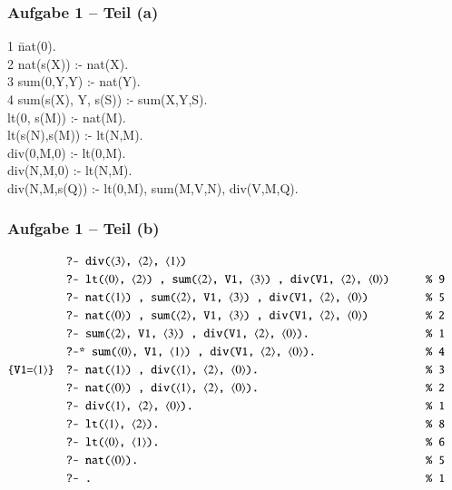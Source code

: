 \documentclass[aspectratio=1610,onlymath, ngerman]{beamer}
\newcommand{\num}[1]{\ensuremath{\langle #1 \rangle}}
\begin{document}
    \maketitle
    
	\begin{frame} \frametitle{Aufgabe 1 -- Teil (a)}
	\small
		\begin{ttfamily}
			\begin{tabbing}
				1 \quad \= nat(0). \\
				2 \> nat(s(X)) :- nat(X). \\[9pt]
				3 \> sum(0,Y,Y) :- nat(Y). \\
				4 \> sum(s(X), Y, s(S)) :- sum(X,Y,S). \\[9pt]  \> lt(0, s(M)) \pause :- nat(M). \\  \> lt(s(N),s(M)) \pause :- lt(N,M). \\[9pt]  \> div(0,M,0) \pause :- lt(0,M). \\  \> div(N,M,0) \pause :- lt(N,M). \\  \> div(N,M,s(Q)) \pause :- lt(0,M), sum(M,V,N), div(V,M,Q).
			\end{tabbing}
		\end{ttfamily}	
		
	\end{frame}
    
    \begin{frame} \frametitle{Aufgabe 1 -- Teil (b)}
	    \begin{alignat*}{2}
		    &\texttt{?- div(\num{3}, \num{2}, \num{1})} \\
		    &\texttt{?- lt(\num{0}, \num{2}) , sum(\num{2}, V1, \num{3}) , div(V1, \num{2}, \num{0})} \qquad && \texttt{\% 9 } \\
		    &\texttt{?- nat(\num{1}) , sum(\num{2}, V1, \num{3}) , div(V1, \num{2}, \num{0})}  && \texttt{\% 5} \\
		    &\texttt{?- nat(\num{0}) , sum(\num{2}, V1, \num{3}) , div(V1, \num{2}, \num{0})} && \texttt{\% 2} \\
		    &\texttt{?- sum(\num{2}, V1, \num{3}) , div(V1, \num{2}, \num{0}).} && \texttt{\% 1} \\
		    &\texttt{?-* sum(\num{0}, V1, \num{1}) , div(V1, \num{2}, \num{0}).} && \texttt{\% 4} \\
		    \texttt{\{V1=\num{1}\}} \quad &\texttt{?- nat(\num{1}) , div(\num{1}, \num{2}, \num{0}).} && \texttt{\% 3} \\
		    &\texttt{?- nat(\num{0}) , div(\num{1}, \num{2}, \num{0}).} \quad && \texttt{\% 2} \\
		    &\texttt{?- div(\num{1}, \num{2}, \num{0}).} && \texttt{\% 1} \\
		    &\texttt{?- lt(\num{1}, \num{2}).} &&\texttt{\% 8} \\
		    &\texttt{?- lt(\num{0}, \num{1}).} &&\texttt{\% 6} \\
		    &\texttt{?- nat(\num{0}).} &&\texttt{\% 5} \\
		    &\texttt{?- .} &&\texttt{\% 1} \\
	    \end{alignat*}
	\end{frame}
    
\end{document}
